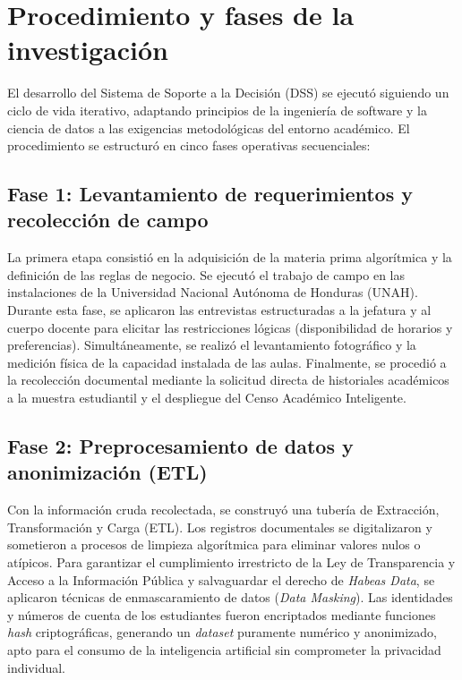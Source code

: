 \section{Procedimiento y fases de la investigación}
El desarrollo del Sistema de Soporte a la Decisión (DSS) se ejecutó siguiendo un ciclo de vida iterativo, adaptando principios de la ingeniería de software y la ciencia de datos a las exigencias metodológicas del entorno académico. El procedimiento se estructuró en cinco fases operativas secuenciales:

\subsection{Fase 1: Levantamiento de requerimientos y recolección de campo}
La primera etapa consistió en la adquisición de la materia prima algorítmica y la definición de las reglas de negocio. Se ejecutó el trabajo de campo en las instalaciones de la Universidad Nacional Autónoma de Honduras (UNAH). Durante esta fase, se aplicaron las entrevistas estructuradas a la jefatura y al cuerpo docente para elicitar las restricciones lógicas (disponibilidad de horarios y preferencias). Simultáneamente, se realizó el levantamiento fotográfico y la medición física de la capacidad instalada de las aulas. Finalmente, se procedió a la recolección documental mediante la solicitud directa de historiales académicos a la muestra estudiantil y el despliegue del Censo Académico Inteligente.

\subsection{Fase 2: Preprocesamiento de datos y anonimización (ETL)}
Con la información cruda recolectada, se construyó una tubería de Extracción, Transformación y Carga (ETL). Los registros documentales se digitalizaron y sometieron a procesos de limpieza algorítmica para eliminar valores nulos o atípicos. Para garantizar el cumplimiento irrestricto de la Ley de Transparencia y Acceso a la Información Pública y salvaguardar el derecho de \textit{Habeas Data}, se aplicaron técnicas de enmascaramiento de datos (\textit{Data Masking}). Las identidades y números de cuenta de los estudiantes fueron encriptados mediante funciones \textit{hash} criptográficas, generando un \textit{dataset} puramente numérico y anonimizado, apto para el consumo de la inteligencia artificial sin comprometer la privacidad individual.

